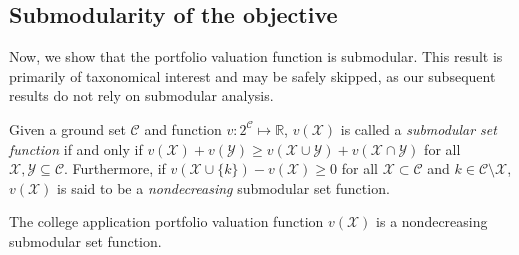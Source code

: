 



\subsection{Submodularity of the objective}

Now, we show that the portfolio valuation function is submodular. This result is primarily of taxonomical interest and may be safely skipped, as our subsequent results do not rely on submodular analysis. 

\begin{definition}
Given a ground set $\mathcal{C}$ and function $v : 2^{\mathcal{C}} \mapsto \mathbb{R}$, $v(\mathcal{X})$ is called a \emph{submodular set function} if and only if $v(\mathcal{X}) + v(\mathcal{Y}) \geq v(\mathcal{X}\cup\mathcal{Y}) + v(\mathcal{X}\cap\mathcal{Y})$
for all $\mathcal{X}, \mathcal{Y} \subseteq \mathcal{C}$. Furthermore, if $ v(\mathcal{X}\cup\{k\}) - v(\mathcal{X}) \geq 0$ for all $\mathcal{X} \subset \mathcal{C}$ and $k \in \mathcal{C} \setminus \mathcal{X}$, $v(\mathcal{X})$ is said to be a \emph{nondecreasing} submodular set function.
\end{definition}

\begin{theorem}
The college application portfolio valuation function
$v(\mathcal{X})$ %
is a nondecreasing submodular set function.
\end{theorem}

